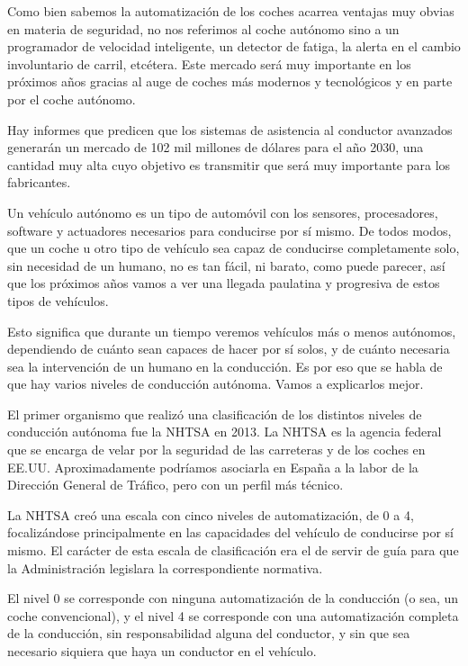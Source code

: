 \documentclass{pclass}
\begin{document}
Como bien sabemos la automatización de los coches acarrea ventajas muy obvias en materia de seguridad, no nos referimos al coche autónomo sino a un programador de velocidad inteligente, un detector de fatiga, la alerta en el cambio involuntario de carril, etcétera. Este mercado será muy importante en los próximos años gracias al auge de coches más modernos y tecnológicos y en parte por el coche autónomo.

Hay informes que predicen que los sistemas de asistencia al conductor avanzados generarán un mercado de 102 mil millones de dólares para el año 2030, una cantidad muy alta cuyo objetivo es transmitir que será muy importante para los fabricantes. 

Un vehículo autónomo es un tipo de automóvil con los sensores, procesadores, software y actuadores necesarios para conducirse por sí mismo. De todos modos, que un coche u otro tipo de vehículo sea capaz de conducirse completamente solo, sin necesidad de un humano, no es tan fácil, ni barato, como puede parecer, así que los próximos años vamos a ver una llegada paulatina y progresiva de estos tipos de vehículos.

Esto significa que durante un tiempo veremos vehículos más o menos autónomos, dependiendo de cuánto sean capaces de hacer por sí solos, y de cuánto necesaria sea la intervención de un humano en la conducción. Es por eso que se habla de que hay varios niveles de conducción autónoma. Vamos a explicarlos mejor.

El primer organismo que realizó una clasificación de los distintos niveles de conducción autónoma fue la NHTSA en 2013. La NHTSA es la agencia federal que se encarga de velar por la seguridad de las carreteras y de los coches en EE.UU. Aproximadamente podríamos asociarla en España a la labor de la Dirección General de Tráfico, pero con un perfil más técnico.

La NHTSA creó una escala con cinco niveles de automatización, de 0 a 4, focalizándose principalmente en las capacidades del vehículo de conducirse por sí mismo. El carácter de esta escala de clasificación era el de servir de guía para que la Administración legislara la correspondiente normativa.

El nivel 0 se corresponde con ninguna automatización de la conducción (o sea, un coche convencional), y el nivel 4 se corresponde con una automatización completa de la conducción, sin responsabilidad alguna del conductor, y sin que sea necesario siquiera que haya un conductor en el vehículo.
\end{document}
